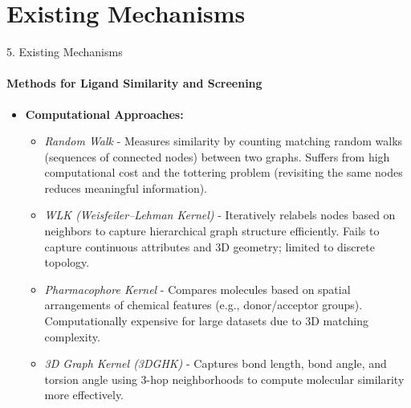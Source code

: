 \documentclass[aspectratio=169, 11pt]{beamer}
\begin{document}
\section{Existing Mechanisms}
\begin{frame}{5. Existing Mechanisms}
\framesubtitle{Methods for Ligand Similarity and Screening}
\begin{itemize}
    \item \textbf{Computational Approaches:}
    \begin{itemize}
        \item \textit{Random Walk} - Measures similarity by counting matching random walks (sequences of connected nodes) between two graphs. Suffers from high computational cost and the tottering problem (revisiting the same nodes reduces meaningful information).

        \item \textit{WLK (Weisfeiler--Lehman Kernel)} - Iteratively relabels nodes based on neighbors to capture hierarchical graph structure efficiently. Fails to capture continuous attributes and 3D geometry; limited to discrete topology.

        \item \textit{Pharmacophore Kernel} - Compares molecules based on spatial arrangements of chemical features (e.g., donor/acceptor groups). Computationally expensive for large datasets due to 3D matching complexity.

        \item \textit{3D Graph Kernel (3DGHK)} - Captures bond length, bond angle, and torsion angle using 3-hop neighborhoods to compute molecular similarity more effectively.
    \end{itemize}
\end{itemize}
\end{frame}
\end{document}
